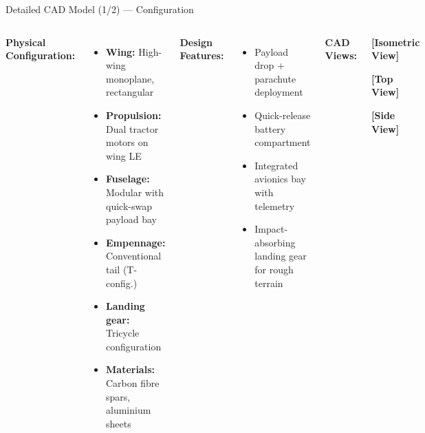 \documentclass[aspectratio=169,11pt]{beamer}
\begin{document}
\begin{frame}{Detailed CAD Model (1/2) — Configuration}

\begin{columns}[T]

  \textbf{\color{navymain}Physical Configuration:}
  \begin{itemize}\setlength\itemsep{3pt}
    \item \textbf{Wing:} High-wing monoplane, rectangular
    \item \textbf{Propulsion:} Dual tractor motors on wing LE
    \item \textbf{Fuselage:} Modular with quick-swap payload bay
    \item \textbf{Empennage:} Conventional tail (T-config.)
    \item \textbf{Landing gear:} Tricycle configuration
    \item \textbf{Materials:} Carbon fibre spars, aluminium sheets
  \end{itemize}

  \vspace{0.35cm}
  \textbf{\color{navymain}Design Features:}
  \begin{itemize}\setlength\itemsep{2pt}
    \item Payload drop + parachute deployment
    \item Quick-release battery compartment
    \item Integrated avionics bay with telemetry
    \item Impact-absorbing landing gear for rough terrain
  \end{itemize}

  \textbf{\color{navymain}CAD Views:}
  \vspace{0.2cm}
  \begin{center}
    \colorbox{iceblue}{\parbox{0.88\linewidth}{%
      \centering\vspace{10pt}
      \textcolor{navymain}{\footnotesize\textbf{[Isometric View]}}
      \vspace{10pt}
    }}
    \vspace{0.1cm}

    \colorbox{iceblue}{\parbox{0.88\linewidth}{%
      \centering\vspace{8pt}
      \textcolor{navymain}{\footnotesize\textbf{[Top View]}}
      \vspace{8pt}
    }}
    \vspace{0.1cm}

    \colorbox{iceblue}{\parbox{0.88\linewidth}{%
      \centering\vspace{8pt}
      \textcolor{navymain}{\footnotesize\textbf{[Side View]}}
      \vspace{8pt}
    }}
  \end{center}

\end{columns}
\end{frame}
\end{document}

